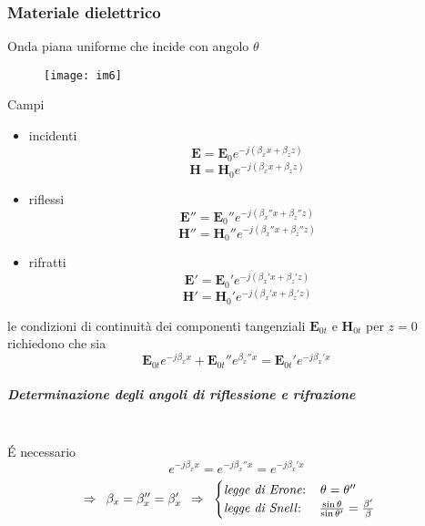 \documentclass[a4paper]{article}
\begin{document}
\subsubsection*{Materiale dielettrico}
Onda piana uniforme che incide con angolo $\theta$
\begin{figure}[ht] 
\centering
\texttt{[image: im6]}
\end{figure}
Campi
\begin{itemize}
\item incidenti
\begin{equation*}
\textbf{E}=\textbf{E}_0e^{-j(\beta_xx+\beta_zz)}
\end{equation*}
\begin{equation*}
\textbf{H}=\textbf{H}_0e^{-j(\beta_xx+\beta_zz)}
\end{equation*}
\item riflessi
\begin{equation*}
\textbf{E}''=\textbf{E}_0''e^{-j(\beta_x''x+\beta_z''z)}
\end{equation*}
\begin{equation*}
\textbf{H}''=\textbf{H}_0''e^{-j(\beta_x''x+\beta_z''z)}
\end{equation*}
\item rifratti
\begin{equation*}
\textbf{E}'=\textbf{E}_0'e^{-j(\beta_x'x+\beta_z'z)}
\end{equation*}
\begin{equation*}
\textbf{H}'=\textbf{H}_0'e^{-j(\beta_x'x+\beta_z'z)}
\end{equation*}
\end{itemize}
le condizioni di continuità dei componenti tangenziali $\textbf{E}_{0t}$ e $\textbf{H}_{0t}$ per $z=0$ richiedono che sia
\begin{equation*}
\textbf{E}_{0t}e^{-j\beta_xx}+\textbf{E}_{0t}''e^{\beta_x''x}=\textbf{E}_{0t}'e^{-j\beta_x'x}
\end{equation*}
\subparagraph*{Determinazione degli angoli di riflessione e rifrazione\\\\}
\'E necessario
\begin{equation*}
e^{-j\beta_xx}=e^{-j\beta_x''x}=e^{-j\beta_x'x}
\end{equation*}
\begin{equation*}
\Rightarrow\,\,\,\beta_x=\beta_x''=\beta_x'\,\,\,\Rightarrow\,\,\,
\begin{cases}
\text{\emph{legge di Erone}:}\hspace{4mm}\theta=\theta''\\
\text{\emph{legge di Snell}:}\hspace{5mm}\frac{\sin\theta}{\sin\theta'}=\frac{\beta'}{\beta}\\
\end{cases}
\end{equation*}
\end{document}
